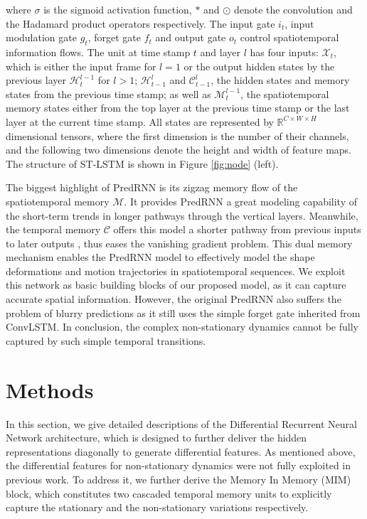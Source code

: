 \documentclass[10pt,twocolumn,letterpaper]{article}
\begin{document}
where $\sigma$ is the sigmoid activation function, $\ast$ and $\odot$ denote the convolution and the Hadamard product operators respectively. The input gate $i_t$, input modulation gate $g_t$, forget gate $f_t$ and output gate $o_t$ control spatiotemporal information flows. The unit at time stamp $t$ and layer $l$ has four inputs: $\mathcal{X}_t$, which is either the input frame for $l=1$ or the output hidden states by the previous layer $\mathcal{H}_t^{l-1}$ for $l>1$; $\mathcal{H}_{t-1}^l$ and $\mathcal{C}_{t-1}^l$, the hidden states and memory states from the previous time stamp; as well as $\mathcal{M}_t^{l-1}$, the spatiotemporal memory states either from the top layer at the previous time stamp or the last layer at the current time stamp. All states are represented by $\mathbb{R}^{C \times W \times H}$ dimensional tensors, where the first dimension is the number of their channels, and the following two dimensions denote the height and width of feature maps. The structure of ST-LSTM is shown in Figure \ref{fig:node} (left).

The biggest highlight of PredRNN is its zigzag memory flow of the spatiotemporal memory $\mathcal{M}$. It provides PredRNN a great modeling capability of the short-term trends in longer pathways through the vertical layers. Meanwhile, the temporal memory $\mathcal{C}$ offers this model a shorter pathway from previous inputs to later outputs \citep{hochreiter1997long}, thus eases the vanishing gradient problem. This dual memory mechanism enables the PredRNN model to effectively model the shape deformations and motion trajectories in spatiotemporal sequences. We exploit this network as basic building blocks of our proposed model, as it can capture accurate spatial information. However, the original PredRNN also suffers the problem of blurry predictions as it still uses the simple forget gate inherited from ConvLSTM. In conclusion, the complex non-stationary dynamics cannot be fully captured by such simple temporal transitions.

\section{Methods}
\label{sec:Methods}
In this section, we give detailed descriptions of the Differential Recurrent Neural Network architecture, which is designed to further deliver the hidden representations diagonally to generate differential features. As mentioned above, the differential features for non-stationary dynamics were not fully exploited in previous work. To address it, we further derive the Memory In Memory (MIM) block, which constitutes two cascaded temporal memory units to explicitly capture the stationary and the non-stationary variations respectively.
\end{document}
